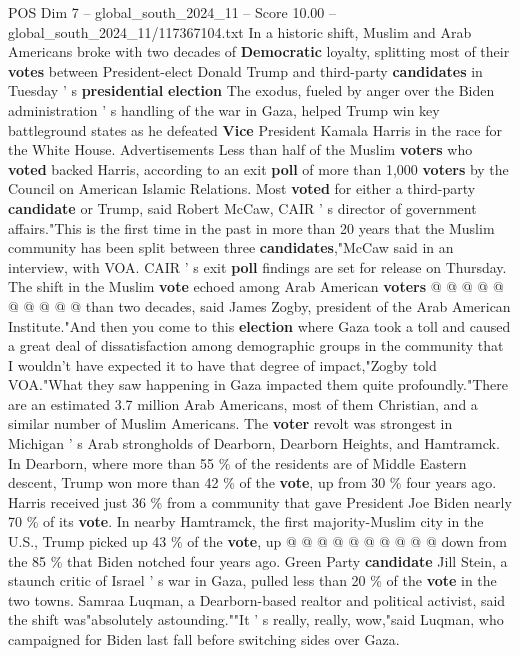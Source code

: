 \begin{textsample}{POS Dim 7 – global\_south\_2024\_11 – Score 10.00 – global\_south\_2024\_11/117367104.txt}  \label{ex:f7_pos_141}
In a historic shift, Muslim and Arab Americans broke with two decades of \textbf{Democratic} loyalty, splitting most of their \textbf{votes} between President-elect Donald Trump and third-party \textbf{candidates} in Tuesday ' s \textbf{presidential} \textbf{election} The exodus, fueled by anger over the Biden administration ' s handling of the war in Gaza, helped Trump win key battleground states as he defeated \textbf{Vice} President Kamala Harris in the race for the White House.
Advertisements Less than half of the Muslim \textbf{voters} who \textbf{voted} backed Harris, according to an exit \textbf{poll} of more than 1,000 \textbf{voters} by the Council on American Islamic Relations.
Most \textbf{voted} for either a third-party \textbf{candidate} or Trump, said Robert McCaw, CAIR ' s director of government affairs."This is the first time in the past in more than 20 years that the Muslim community has been split between three \textbf{candidates},"McCaw said in an interview, with VOA.
CAIR ' s exit \textbf{poll} findings are set for release on Thursday.
The shift in the Muslim \textbf{vote} echoed among Arab American \textbf{voters} @ @ @ @ @ @ @ @ @ @ than two decades, said James Zogby, president of the Arab American Institute."And then you come to this \textbf{election} where Gaza took a toll and caused a great deal of dissatisfaction among demographic groups in the community that I wouldn't have expected it to have that degree of impact,"Zogby told VOA."What they saw happening in Gaza impacted them quite profoundly."There are an estimated 3.7 million Arab Americans, most of them Christian, and a similar number of Muslim Americans.
The \textbf{voter} revolt was strongest in Michigan ' s Arab strongholds of Dearborn, Dearborn Heights, and Hamtramck.
In Dearborn, where more than 55 \% of the residents are of Middle Eastern descent, Trump won more than 42 \% of the \textbf{vote}, up from 30 \% four years ago.
Harris received just 36 \% from a community that gave President Joe Biden nearly 70 \% of its \textbf{vote}.
In nearby Hamtramck, the first majority-Muslim city in the U.S., Trump picked up 43 \% of the \textbf{vote}, up @ @ @ @ @ @ @ @ @ @ down from the 85 \% that Biden notched four years ago.
Green Party \textbf{candidate} Jill Stein, a staunch critic of Israel ' s war in Gaza, pulled less than 20 \% of the \textbf{vote} in the two towns.
Samraa Luqman, a Dearborn-based realtor and political activist, said the shift was"absolutely astounding.""It ' s really, really, wow,"said Luqman, who campaigned for Biden last fall before switching sides over Gaza.

\end{textsample}

